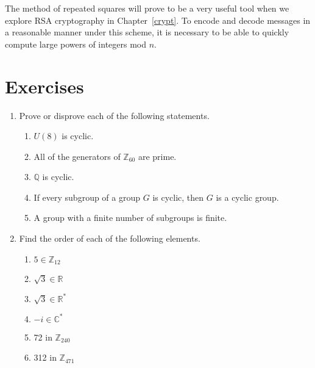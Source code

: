  
The method of repeated squares will prove to be a very useful tool
when we explore  RSA cryptography  in Chapter~\ref{crypt}. To encode and decode
messages in a reasonable manner under this scheme, it is necessary to
be able to quickly compute large powers of integers mod $n$.
 
 
\section*{Exercises}
\exrule
 
 
 
 
{\small
\begin{enumerate}
 
 
\item
Prove or disprove each of the following statements.
\begin{enumerate}
 
 \item
$U(8)$ is cyclic.
 
 \item
All of the generators of ${\mathbb Z}_{60}$ are prime.
 
 \item
${\mathbb Q}$ is cyclic.
 
 \item
If every subgroup of a group $G$ is cyclic, then $G$ is a cyclic
group. 
 
 \item
A group with a finite number of subgroups is finite.
 
\end{enumerate}
 
  
\item
Find the order of each of the following elements.
\begin{multicols}{3}
\begin{enumerate}

\item
$5 \in {\mathbb Z}_{12}$

\item
$\sqrt{3} \in {\mathbb R}$
 
\item
$\sqrt{3} \in {\mathbb R}^\ast$
 
\item
$-i \in {\mathbb C}^\ast$

\item
72 in ${\mathbb Z}_{240}$
 
\item
312 in ${\mathbb Z}_{471}$
 

\end{enumerate}
\end{multicols}
\end{enumerate}}
